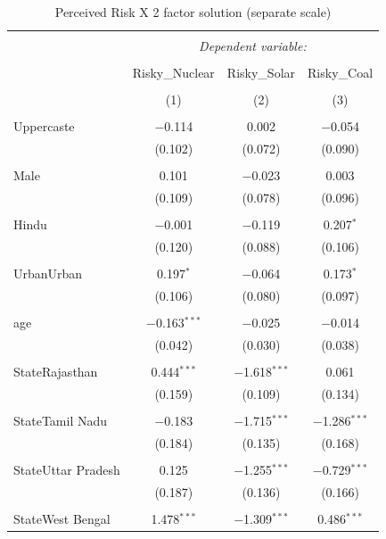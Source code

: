 \documentclass[
]{article}
\begin{document}
\begin{table}[!htbp] \centering 
  \caption{Perceived Risk X 2 factor solution (separate scale)} 
  \label{} 
\begin{tabular}{@{\extracolsep{5pt}}lccc} 
\\[-1.8ex]\hline 
\hline \\[-1.8ex] 
 & \multicolumn{3}{c}{\textit{Dependent variable:}} \\ 
\cline{2-4} 
\\[-1.8ex] & Risky\_Nuclear & Risky\_Solar & Risky\_Coal \\ 
\\[-1.8ex] & (1) & (2) & (3)\\ 
\hline \\[-1.8ex] 
 Uppercaste & $-$0.114 & 0.002 & $-$0.054 \\ 
  & (0.102) & (0.072) & (0.090) \\ 
  & & & \\ 
 Male & 0.101 & $-$0.023 & 0.003 \\ 
  & (0.109) & (0.078) & (0.096) \\ 
  & & & \\ 
 Hindu & $-$0.001 & $-$0.119 & 0.207$^{*}$ \\ 
  & (0.120) & (0.088) & (0.106) \\ 
  & & & \\ 
 UrbanUrban & 0.197$^{*}$ & $-$0.064 & 0.173$^{*}$ \\ 
  & (0.106) & (0.080) & (0.097) \\ 
  & & & \\ 
 age & $-$0.163$^{***}$ & $-$0.025 & $-$0.014 \\ 
  & (0.042) & (0.030) & (0.038) \\ 
  & & & \\ 
 StateRajasthan & 0.444$^{***}$ & $-$1.618$^{***}$ & 0.061 \\ 
  & (0.159) & (0.109) & (0.134) \\ 
  & & & \\ 
 StateTamil Nadu & $-$0.183 & $-$1.715$^{***}$ & $-$1.286$^{***}$ \\ 
  & (0.184) & (0.135) & (0.168) \\ 
  & & & \\ 
 StateUttar Pradesh & 0.125 & $-$1.255$^{***}$ & $-$0.729$^{***}$ \\ 
  & (0.187) & (0.136) & (0.166) \\ 
  & & & \\ 
 StateWest Bengal & 1.478$^{***}$ & $-$1.309$^{***}$ & 0.486$^{***}$ \\ 

\end{tabular}
\end{table}
\end{document}
